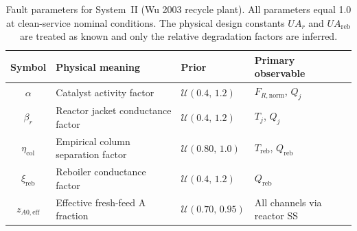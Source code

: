 \documentclass[aps,pre,twocolumn,superscriptaddress,floatfix]{revtex4-2}
\begin{document}
\begin{table}[tb]
\centering
\caption{Fault parameters for System~II (Wu 2003 recycle plant). All parameters
  equal 1.0 at clean-service nominal conditions. The physical design constants
  $U\!A_r$ and $U\!A_\mathrm{reb}$ are treated as known and only the relative
  degradation factors are inferred.}
\label{tab:wu_fault_params}
\small
\begin{tabular}{clll}
\toprule
Symbol & Physical meaning & Prior & Primary observable \\  
\midrule
$\alpha$ & Catalyst activity factor & $\mathcal{U}(0.4,\,1.2)$ & $F_{R,\mathrm{norm}}$, $Q_j$ \\
$\beta_r$ & Reactor jacket conductance factor & $\mathcal{U}(0.4,\,1.2)$ & $T_j$, $Q_j$ \\
$\eta_\mathrm{col}$ & Empirical column separation factor & $\mathcal{U}(0.80,\,1.0)$ & $T_\mathrm{reb}$, $Q_\mathrm{reb}$ \\
$\xi_\mathrm{reb}$ & Reboiler conductance factor & $\mathcal{U}(0.4,\,1.2)$ & $Q_\mathrm{reb}$ \\
$z_{A0,\mathrm{eff}}$ & Effective fresh-feed A fraction & $\mathcal{U}(0.70,\,0.95)$ & All channels via reactor SS \\
\bottomrule
\end{tabular}
\end{table}
\end{document}
